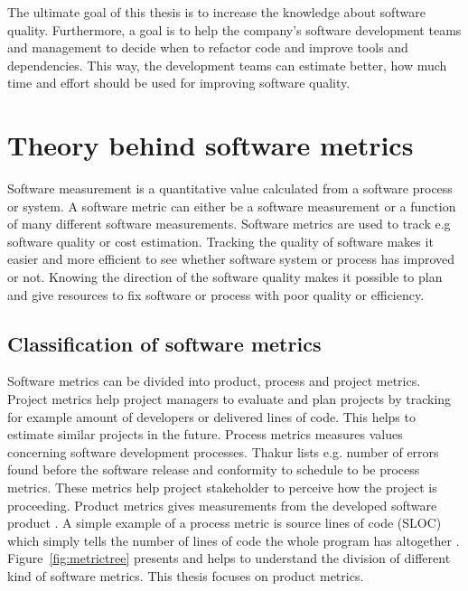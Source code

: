 The ultimate goal of this thesis is to increase the knowledge about software quality. Furthermore, a goal is to help the company’s software development teams and management to decide when to refactor code and improve tools and dependencies. This way, the development teams can estimate better, how much time and effort should be used for improving software quality.





\chapter{Theory behind software metrics}
\label{chap:theory}

Software measurement is a quantitative value calculated from a software process or system. A software metric can either be a software measurement or a function of many different software measurements. Software metrics are used to track e.g software quality or cost estimation. Tracking the quality of software makes it easier and more efficient to see whether software system or process has improved or not. Knowing the direction of the software quality makes it possible to plan and give resources to fix software or process with poor quality or efficiency. 

\section{Classification of software metrics}

Software metrics can be divided into product, process and project metrics. Project metrics \cite{dineshthakur} help project managers to evaluate and plan projects by tracking for example amount of developers or delivered lines of code. This helps to estimate similar projects in the future. Process metrics measures values concerning software development processes. Thakur lists e.g. number of errors found before the software release and conformity to schedule to be process metrics. These metrics help project stakeholder to perceive how the project is proceeding.
Product metrics gives measurements from the developed software product \cite{sommerville2011software}.  A simple example of a process metric is source lines of code (SLOC) which simply tells the number of lines of code the whole program has altogether \cite{nguyen2007sloc}. Figure~\ref{fig:metrictree} presents and helps to understand the division of different kind of software metrics. This thesis focuses on product metrics. 

